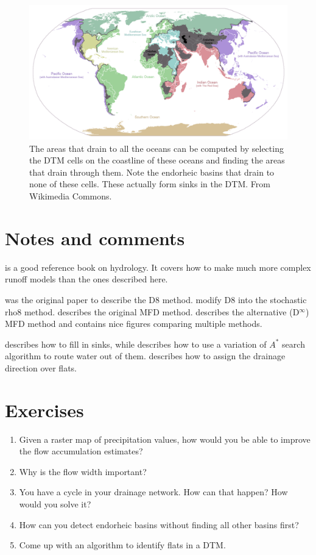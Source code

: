\begin{figure}[htbp]
\centering
\includegraphics[width=\linewidth]{figs/Ocean_drainage}
\caption{The areas that drain to all the oceans can be computed by selecting the DTM cells on the coastline of these oceans and finding the areas that drain through them.
Note the endorheic basins that drain to none of these cells.
These actually form sinks in the DTM\@.
From Wikimedia Commons.}%
\label{fig:oceans}
\end{figure}

%
\section{Notes and comments}

\citet{Beven12} is a good reference book on hydrology.
It covers how to make much more complex runoff models than the ones described here.

\citet{OCallaghan84} was the original paper to describe the D8 method.
\citet{Fairfield91} modify D8 into the stochastic rho8 method.
\citet{Quinn91} describes the original MFD method.
\citet{Tarborton97} describes the alternative (D\(^{\infty}\)) MFD method and contains nice figures comparing multiple methods.

\citet{Barnes14a} describes how to fill in sinks, while \citet{Metz11} describes how to use a variation of \(A^{*}\) search algorithm to route water out of them.
\citet{Barnes14} describes how to assign the drainage direction over flats.

%
\section{Exercises}

\begin{enumerate}
\item Given a raster map of precipitation values, how would you be able to improve the flow accumulation estimates?
\item Why is the flow width important?
\item You have a cycle in your drainage network. How can that happen? How would you solve it?
\item How can you detect endorheic basins without finding all other basins first?
\item Come up with an algorithm to identify flats in a DTM\@.
\end{enumerate}
